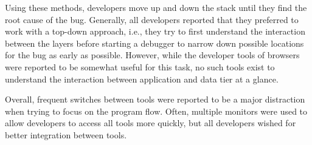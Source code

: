 Using these methods, developers move up and down the stack until they find the root cause of the bug.
Generally, all developers reported that they preferred to work with a top-down approach, i.e., they try to first understand the interaction between the layers before starting a debugger to narrow down possible locations for the bug as early as possible.
However, while the developer tools of browsers were reported to be somewhat useful for this task, no such tools exist to understand the interaction between application and data tier at a glance.

Overall, frequent switches between tools were reported to be a major distraction when trying to focus on the program flow.
Often, multiple monitors were used to allow developers to access all tools more quickly, but all developers wished for better integration between tools.
\tmpEnd
%
%
%
%
%
%
%
